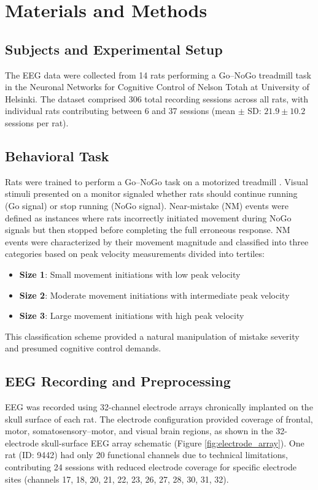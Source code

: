 \documentclass[11pt]{article}
\begin{document}
\section{Materials and Methods}

\subsection{Subjects and Experimental Setup}

The EEG data were collected from 14 rats performing a Go–NoGo treadmill task in the Neuronal Networks for Cognitive Control of Nelson Totah at University of Helsinki. The dataset comprised 306 total recording sessions across all rats, with individual rats contributing between 6 and 37 sessions (mean $\pm$ SD: $21.9 \pm 10.2$ sessions per rat).

\subsection{Behavioral Task}

Rats were trained to perform a Go–NoGo task on a motorized treadmill \citep{doutel2024volitional}. Visual stimuli presented on a monitor signaled whether rats should continue running (Go signal) or stop running (NoGo signal). Near-mistake (NM) events were defined as instances where rats incorrectly initiated movement during NoGo signals but then stopped before completing the full erroneous response. 
NM events were characterized by their movement magnitude and classified into three categories based on peak velocity measurements divided into tertiles:
\begin{itemize}
\item \textbf{Size 1}: Small movement initiations with low peak velocity
\item \textbf{Size 2}: Moderate movement initiations with intermediate peak velocity
\item \textbf{Size 3}: Large movement initiations with high peak velocity
\end{itemize}

This classification scheme provided a natural manipulation of mistake severity and presumed cognitive control demands.

\subsection{EEG Recording and Preprocessing}

EEG was recorded using 32-channel electrode arrays chronically implanted on the skull surface of each rat. The electrode configuration provided coverage of frontal, motor, somatosensory–motor, and visual brain regions, as shown in the 32-electrode skull-surface EEG array schematic (Figure \ref{fig:electrode_array}). One rat (ID: 9442) had only 20 functional channels due to technical limitations, contributing 24 sessions with reduced electrode coverage for specific electrode sites (channels 17, 18, 20, 21, 22, 23, 26, 27, 28, 30, 31, 32).
\end{document}
